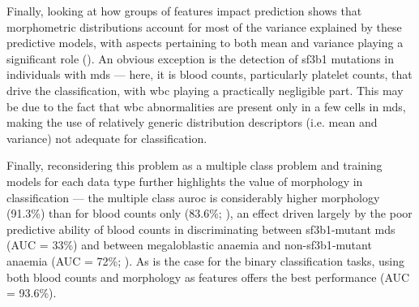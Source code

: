 Finally, looking at how groups of features impact prediction shows that morphometric distributions account for most of the variance explained by these predictive models, with aspects pertaining to both mean and variance playing a significant role (). An obvious exception is the detection of \ac{sf3b1} mutations in individuals with \ac{mds} --- here, it is blood counts, particularly platelet counts, that drive the classification, with \ac{wbc} playing a practically negligible part. This may be due to the fact that \ac{wbc} abnormalities are present only in a few cells in \ac{mds}, making the use of relatively generic distribution descriptors (i.e. mean and variance) not adequate for classification.

\begin{figure}[!ht]
    \label{fig:feature-group-importance}
\end{figure}

Finally, reconsidering this problem as a multiple class problem and training models for each data type further highlights the value of morphology in classification --- the multiple class \ac{auroc} is considerably higher morphology (91.3\%) than for blood counts only (83.6\%; ), an effect driven largely by the poor predictive ability of blood counts in discriminating between \ac{sf3b1}-mutant \ac{mds} (AUC = 33\%) and between megaloblastic anaemia and non-\ac{sf3b1}-mutant anaemia (AUC = 72\%; ). As is the case for the binary classification tasks, using both blood counts and morphology as features offers the best performance (AUC = 93.6\%).

\begin{figure}[!ht]
    \label{fig:multiclass-auc}
\end{figure}

\begin{figure}[!ht]
    \label{fig:multiclass-auc-heatmap}
\end{figure}

